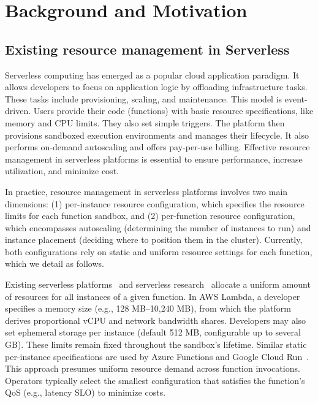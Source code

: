 \section{Background and Motivation}
\label{sec:background}

\subsection{Existing resource management in Serverless}
\label{sec:background:resource-management}


Serverless computing has emerged as a popular cloud application paradigm. It allows
developers to focus on application logic by offloading infrastructure tasks. These
tasks include provisioning, scaling, and maintenance. This model is event-driven.
Users provide their code (functions) with basic resource specifications, like memory
and CPU limits. They also set simple triggers. The platform then provisions
sandboxed execution environments and manages their lifecycle. It also performs
on-demand autoscaling and offers pay-per-use billing. Effective resource management
in serverless platforms is essential to ensure performance, increase utilization, and minimize cost.

In practice, resource management in serverless platforms involves two main dimensions:
(1) per-instance resource configuration, which specifies the resource limits for each function
sandbox, and (2) per-function resource configuration, which encompasses autoscaling
(determining the number of instances to run) and instance placement (deciding where to position them in the cluster).
Currently, both configurations rely on static and uniform resource settings for each function,
which we detail as follows.

Existing serverless platforms~\cite{Doc:Azure_Functions_Hosting,
Doc:GCP_CloudRun_Mem, aws_lambda} and serverless research~\cite{ASPLOS21:FaasCache, shahrad2020serverless, wang2018peeking, pu2019shuffling}
allocate a uniform amount of resources for all instances of a given function. In AWS Lambda, a
developer specifies a memory size (e.g., 128 MB–10,240 MB), from which the
platform derives proportional vCPU and network bandwidth shares. Developers may
also set ephemeral storage per instance (default 512 MB, configurable up to
several GB). These limits remain fixed throughout the sandbox's lifetime.
Similar static per-instance specifications are used by Azure Functions and
Google Cloud Run~\cite{Doc:Azure_Functions_Hosting, Doc:GCP_CloudRun_Mem}. This
approach presumes uniform resource demand across function invocations.
Operators typically select the smallest configuration that satisfies the
function's QoS (e.g., latency SLO) to minimize costs.

